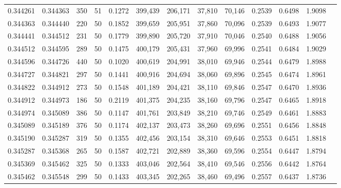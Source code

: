 \begin{tabular}{rrrrrrrrrrrrr}
0.344261 & 0.344363 &   350 &  51 &                                     0.1272 & 399,439 & 206,171 &  37,810 &  70,146 & 0.2539 & 0.6498 & 1.9098 \\
0.344363 & 0.344440 &   220 &  50 &                                     0.1852 & 399,659 & 205,951 &  37,860 &  70,096 & 0.2539 & 0.6493 & 1.9077 \\
0.344441 & 0.344512 &   231 &  50 &                                     0.1779 & 399,890 & 205,720 &  37,910 &  70,046 & 0.2540 & 0.6488 & 1.9056 \\
0.344512 & 0.344595 &   289 &  50 &                                     0.1475 & 400,179 & 205,431 &  37,960 &  69,996 & 0.2541 & 0.6484 & 1.9029 \\
0.344596 & 0.344726 &   440 &  50 &                                     0.1020 & 400,619 & 204,991 &  38,010 &  69,946 & 0.2544 & 0.6479 & 1.8988 \\
0.344727 & 0.344821 &   297 &  50 &                                     0.1441 & 400,916 & 204,694 &  38,060 &  69,896 & 0.2545 & 0.6474 & 1.8961 \\
0.344822 & 0.344912 &   273 &  50 &                                     0.1548 & 401,189 & 204,421 &  38,110 &  69,846 & 0.2547 & 0.6470 & 1.8936 \\
0.344912 & 0.344973 &   186 &  50 &                                     0.2119 & 401,375 & 204,235 &  38,160 &  69,796 & 0.2547 & 0.6465 & 1.8918 \\
0.344974 & 0.345089 &   386 &  50 &                                     0.1147 & 401,761 & 203,849 &  38,210 &  69,746 & 0.2549 & 0.6461 & 1.8883 \\
0.345089 & 0.345189 &   376 &  50 &                                     0.1174 & 402,137 & 203,473 &  38,260 &  69,696 & 0.2551 & 0.6456 & 1.8848 \\
0.345190 & 0.345287 &   319 &  50 &                                     0.1355 & 402,456 & 203,154 &  38,310 &  69,646 & 0.2553 & 0.6451 & 1.8818 \\
0.345287 & 0.345368 &   265 &  50 &                                     0.1587 & 402,721 & 202,889 &  38,360 &  69,596 & 0.2554 & 0.6447 & 1.8794 \\
0.345369 & 0.345462 &   325 &  50 &                                     0.1333 & 403,046 & 202,564 &  38,410 &  69,546 & 0.2556 & 0.6442 & 1.8764 \\
0.345462 & 0.345548 &   299 &  50 &                                     0.1433 & 403,345 & 202,265 &  38,460 &  69,496 & 0.2557 & 0.6437 & 1.8736 \\

\end{tabular}

